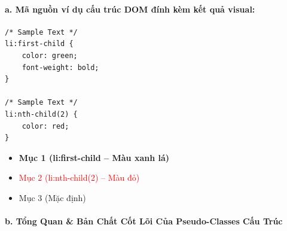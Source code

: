 \documentclass[11pt,oneside]{book}
\begin{document}
\paragraph{a. Mã nguồn ví dụ cấu trúc DOM đính kèm kết quả visual:}

\begin{codeWindow}
\begin{lstlisting}[language=CSS3]
/* Sample Text */
li:first-child {
    color: green;
    font-weight: bold;
}

/* Sample Text */
li:nth-child(2) {
    color: red;
}
\end{lstlisting}
\end{codeWindow}

\begin{browserWindow}
\sffamily\small
\begin{itemize}[leftmargin=1.5em, itemsep=2pt, parsep=0pt]
    \item \textcolor{green!70!black}{\textbf{Mục 1 (li:first-child -- Màu xanh lá)}}
    \item \textcolor{red}{Mục 2 (li:nth-child(2) -- Màu đỏ)}
    \item Mục 3 (Mặc định)
\end{itemize}
\end{browserWindow}

\paragraph{b. Tổng Quan \& Bản Chất Cốt Lõi Của Pseudo-Classes Cấu Trúc}
\end{document}
